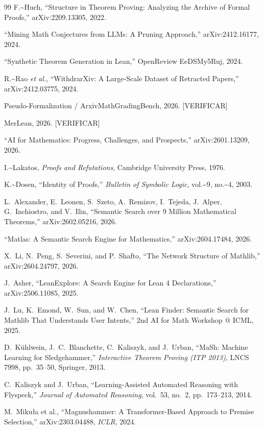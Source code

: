 \documentclass[12pt,a4paper]{article}
\theoremstyle{remark}
\begin{document}
\begin{thebibliography}{99}
F.\textasciitilde{}Huch, ``Structure in Theorem Proving: Analyzing the Archive of Formal Proofs,''
arXiv:2209.13305, 2022.

``Mining Math Conjectures from LLMs: A Pruning Approach,''
arXiv:2412.16177, 2024.

``Synthetic Theorem Generation in Lean,''
OpenReview EeDSMy5Ruj, 2024.

R.\textasciitilde{}Rao \emph{et al.}, ``WithdrarXiv: A Large-Scale Dataset of Retracted Papers,''
arXiv:2412.03775, 2024.

Pseudo-Formalization / ArxivMathGradingBench, 2026. {[}VERIFICAR{]}

MerLean, 2026. {[}VERIFICAR{]}

``AI for Mathematics: Progress, Challenges, and Prospects,''
arXiv:2601.13209, 2026.

I.\textasciitilde{}Lakatos, \emph{Proofs and Refutations}, Cambridge University Press, 1976.

K.\textasciitilde{}Dosen, ``Identity of Proofs,''
\emph{Bulletin of Symbolic Logic}, vol.\textasciitilde{}9, no.\textasciitilde{}4, 2003.

L.~Alexander, E.~Leonen, S.~Szeto, A.~Remizov, I.~Tejeda, J.~Alper,
G.~Inchiostro, and V.~Ilin, ``Semantic Search over 9 Million Mathematical Theorems,''
arXiv:2602.05216, 2026.

``Matlas: A Semantic Search Engine for Mathematics,'' arXiv:2604.17484, 2026.

X.~Li, N.~Peng, S.~Severini, and P.~Shafto, ``The Network Structure of Mathlib,''
arXiv:2604.24797, 2026.

J.~Asher, ``LeanExplore: A Search Engine for Lean 4 Declarations,''
arXiv:2506.11085, 2025.

J.~Lu, K.~Emond, W.~Sun, and W.~Chen, ``Lean Finder: Semantic Search for Mathlib
That Understands User Intents,'' 2nd AI for Math Workshop @ ICML, 2025.

D.~K\"uhlwein, J.~C.~Blanchette, C.~Kaliszyk, and J.~Urban,
``MaSh: Machine Learning for Sledgehammer,''
\emph{Interactive Theorem Proving (ITP 2013)}, LNCS 7998, pp.~35--50, Springer, 2013.

C.~Kaliszyk and J.~Urban, ``Learning-Assisted Automated Reasoning with Flyspeck,''
\emph{Journal of Automated Reasoning}, vol.~53, no.~2, pp.~173--213, 2014.

M.~Miku{\l}a et al., ``Magnushammer: A Transformer-Based Approach to Premise Selection,''
arXiv:2303.04488, \emph{ICLR}, 2024.

\end{thebibliography}
\end{document}
